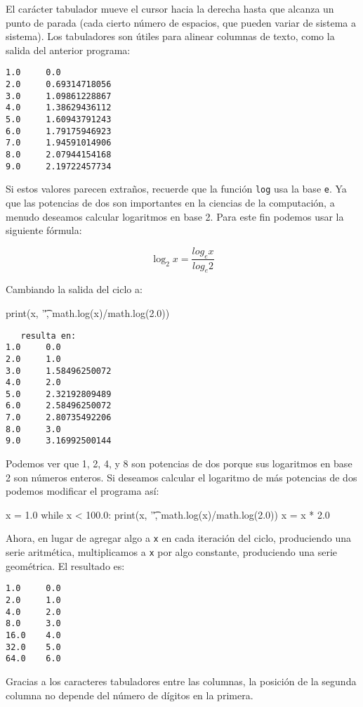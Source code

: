 El carácter tabulador mueve el cursor hacia la derecha hasta que alcanza
un punto de parada (cada cierto número de espacios, que pueden variar
de sistema a sistema). Los tabuladores son útiles para alinear columnas
de texto, como la salida del anterior programa:
\begin{verbatim}
1.0     0.0
2.0     0.69314718056
3.0     1.09861228867
4.0     1.38629436112
5.0     1.60943791243
6.0     1.79175946923
7.0     1.94591014906
8.0     2.07944154168
9.0     2.19722457734
\end{verbatim}
Si estos valores parecen extraños, recuerde que la función \texttt{log}
usa la base \texttt{e}. Ya que las potencias de dos son importantes
en la ciencias de la computación, a menudo deseamos calcular logaritmos
en base 2. Para este fin podemos usar la siguiente fórmula:

\begin{equation}
\log_{2}x=\frac{log_{e}x}{log_{e}2}
\end{equation}

Cambiando la salida del ciclo a:
\begin{pythoncode}
print(x, '\t',  math.log(x)/math.log(2.0))
\end{pythoncode}
\begin{verbatim}
   resulta en:
1.0     0.0
2.0     1.0
3.0     1.58496250072
4.0     2.0
5.0     2.32192809489
6.0     2.58496250072
7.0     2.80735492206
8.0     3.0
9.0     3.16992500144
\end{verbatim}
Podemos ver que 1, 2, 4, y 8 son potencias de dos porque sus logaritmos
en base 2 son números enteros. Si deseamos calcular el logaritmo de
más potencias de dos podemos modificar el programa así:
\begin{pythoncode}
x = 1.0
while x < 100.0:
  print(x, '\t', math.log(x)/math.log(2.0))
  x = x * 2.0
\end{pythoncode}

Ahora, en lugar de agregar algo a \texttt{x} en cada iteración del
ciclo, produciendo una serie aritmética, multiplicamos a \texttt{x}
por algo constante, produciendo una serie geométrica. El resultado
es:

 
\begin{verbatim}
1.0     0.0
2.0     1.0
4.0     2.0
8.0     3.0
16.0    4.0
32.0    5.0
64.0    6.0
\end{verbatim}
Gracias a los caracteres tabuladores entre las columnas, la posición
de la segunda columna no depende del número de dígitos en la primera.

